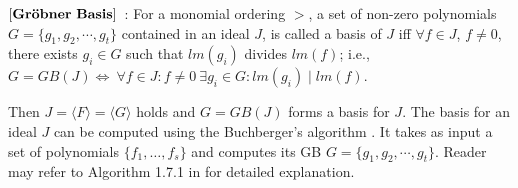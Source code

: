 \begin{Definition}
\label{def:gb}
$\bf{\left[Gr\ddot{o}bner\ Basis\right]}$~\cite{gb_book}: 
For a monomial ordering $>$, a set  of non-zero polynomials $G =
\{g_1,g_2,\cdots,g_t\}$ contained in an ideal $J$, is called a
\Grobner basis of $J$ iff 
$\forall f \in J$, $f\neq 0$, there exists $g_i\in G$ 
such that $lm(g_i)$ divides $lm(f)$; i.e., $G = GB(J)
\Leftrightarrow\  \forall f \in J : f \neq 0 \ \exists g_i \in G :
lm(g_i)\mid lm(f)$.  
\end{Definition}

Then $J = \langle F \rangle = \langle G \rangle$ holds and $G=GB(J)$
forms a basis for $J$. The \Grobner basis for an ideal $J$ can be
computed using the  Buchberger's algorithm \cite{buchberger_thesis}. 
It takes as input a set of polynomials $\{f_1,\dots, f_s\}$ and
computes its GB $G = \{g_1,g_2,\cdots,g_t\}$. Reader may refer to Algorithm 1.7.1 in \cite{gb_book} for detailed explanation.

